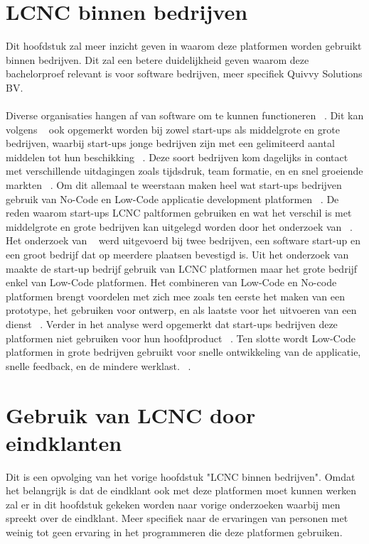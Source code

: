 \section{LCNC binnen bedrijven}
\label{sec:lcnc-bedrijven}
Dit hoofdstuk zal meer inzicht geven in waarom deze platformen worden gebruikt binnen bedrijven. Dit zal een betere duidelijkheid geven
waarom deze bachelorproef relevant is voor software bedrijven, meer specifiek Quivvy Solutions BV.
\\
\\
Diverse organisaties hangen af van software om te kunnen functioneren ~\autocite{Hintsch2021}. Dit kan volgens ~\textcite{Rafiq_2022} ook opgemerkt worden bij zowel
start-ups als middelgrote en grote bedrijven, waarbij start-ups jonge bedrijven zijn met een gelimiteerd aantal middelen tot hun beschikking ~\autocite{Rafiq_2022}. Deze soort bedrijven
kom dagelijks in contact met verschillende uitdagingen zoals tijdsdruk, team formatie, en en snel groeiende markten ~\autocite{Rafiq_2022}. Om dit allemaal te weerstaan maken heel wat
start-ups bedrijven gebruik van No-Code en Low-Code applicatie development platformen ~\autocite{Rafiq_2022}. De reden waarom start-ups LCNC paltformen gebruiken en wat het verschil is met 
middelgrote en grote bedrijven kan uitgelegd worden door het onderzoek van ~\textcite{Rafiq_2022}. Het onderzoek van ~\textcite{Rafiq_2022} werd uitgevoerd bij twee bedrijven, een software start-up en een groot bedrijf
dat op meerdere plaatsen bevestigd is. Uit het onderzoek van ~\textcite{Rafiq_2022} maakte de start-up bedrijf gebruik van LCNC platformen maar het grote bedrijf enkel van Low-Code platformen. Het combineren van Low-Code en No-code platformen
brengt voordelen met zich mee zoals ten eerste het maken van een prototype, het gebruiken voor ontwerp, en als laatste voor het uitvoeren van een dienst ~\autocite{Rafiq_2022}. 
Verder in het analyse werd opgemerkt dat start-ups bedrijven deze platformen niet gebruiken voor hun hoofdproduct ~\autocite{Rafiq_2022}. Ten slotte wordt
Low-Code platformen in grote bedrijven gebruikt voor snelle ontwikkeling van de applicatie, snelle feedback, en de mindere werklast. ~\autocite{Rafiq_2022}.




\section{Gebruik van LCNC door eindklanten}
\label{sec:lcnc-eindklanten}
Dit is een opvolging van het vorige hoofdstuk "LCNC binnen bedrijven". Omdat het belangrijk is dat de eindklant ook met deze platformen moet kunnen werken
zal er in dit hoofdstuk gekeken worden naar vorige onderzoeken waarbij men spreekt over de eindklant. 
Meer specifiek naar de ervaringen van personen met weinig tot geen ervaring in het programmeren die deze platformen gebruiken.


